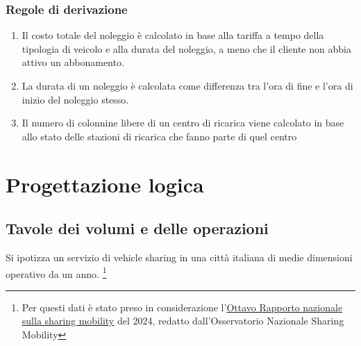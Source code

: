 \documentclass{article}
\begin{document}
\subsubsection{Regole di derivazione}
\begin{enumerate}
    \item Il costo totale del noleggio è calcolato in base alla tariffa a tempo della tipologia di veicolo e alla durata del noleggio, a meno che il cliente non abbia attivo un abbonamento.
    \item La durata di un noleggio è calcolata come differenza tra l'ora di fine e l'ora di inizio del noleggio stesso.
    \item Il numero di colonnine libere di un centro di ricarica viene calcolato in base allo stato delle stazioni di ricarica che fanno parte di quel centro
\end{enumerate}

\newpage

\section{Progettazione logica}

\subsection{Tavole dei volumi e delle operazioni}

Si ipotizza un servizio di vehicle sharing in una città italiana di medie dimensioni operativo da un anno. \footnote{Per questi dati è stato preso in considerazione l'\href{https://osservatoriosharingmobility.it/wp-content/uploads/2024/12/Rapporto-sharing-mobility-2024.pdf}{Ottavo Rapporto nazionale sulla sharing mobility} del 2024, redatto dall'Osservatorio Nazionale Sharing Mobility}
\end{document}
